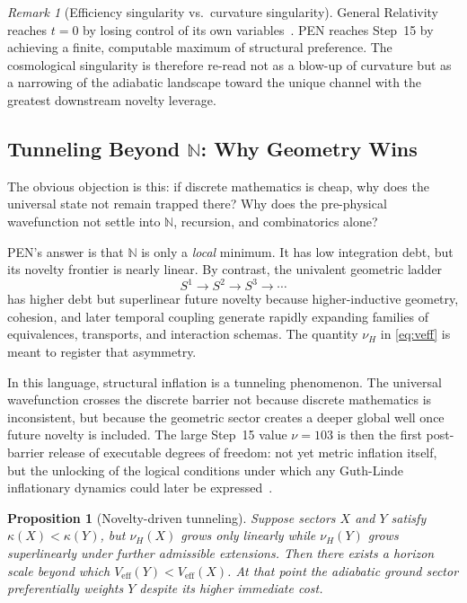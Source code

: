 \documentclass[11pt,a4paper]{article}
\theoremstyle{plain}
\newtheorem{proposition}[theorem]{Proposition}
\theoremstyle{definition}
\theoremstyle{remark}
\newtheorem{remark}[theorem]{Remark}
\newcommand{\N}{\mathbb{N}}
\begin{document}
\begin{remark}[Efficiency singularity vs.\ curvature singularity]
\label{rem:singularity-contrast}
General Relativity reaches $t = 0$ by losing control of its own variables~\cite{hawking-ellis,wald}.
PEN reaches Step~15 by achieving a finite, computable maximum of structural preference.
The cosmological singularity is therefore re-read not as a blow-up of curvature but as a narrowing of the adiabatic landscape toward the unique channel with the greatest downstream novelty leverage.
\end{remark}

\subsection{Tunneling Beyond \texorpdfstring{$\N$}{N}: Why Geometry Wins}
\label{sec:nu-explosion}

The obvious objection is this: if discrete mathematics is cheap, why does the universal state not remain trapped there?
Why does the pre-physical wavefunction not settle into $\N$, recursion, and combinatorics alone?

PEN's answer is that $\N$ is only a \emph{local} minimum.
It has low integration debt, but its novelty frontier is nearly linear.
By contrast, the univalent geometric ladder
\begin{equation}
    S^1 \to S^2 \to S^3 \to \cdots
\end{equation}
has higher debt but superlinear future novelty because higher-inductive geometry, cohesion, and later temporal coupling generate rapidly expanding families of equivalences, transports, and interaction schemas.
The quantity $\nu_H$ in \eqref{eq:veff} is meant to register that asymmetry.

In this language, structural inflation is a tunneling phenomenon.
The universal wavefunction crosses the discrete barrier not because discrete mathematics is inconsistent, but because the geometric sector creates a deeper global well once future novelty is included.
The large Step~15 value $\nu = 103$ is then the first post-barrier release of executable degrees of freedom: not yet metric inflation itself, but the unlocking of the logical conditions under which any Guth-Linde inflationary dynamics could later be expressed~\cite{guth,linde,vilenkin}.

\begin{proposition}[Novelty-driven tunneling]
\label{prop:tunneling}
Suppose sectors $X$ and $Y$ satisfy $\kappa(X) < \kappa(Y)$, but $\nu_H(X)$ grows only linearly while $\nu_H(Y)$ grows superlinearly under further admissible extensions.
Then there exists a horizon scale beyond which $V_{\mathrm{eff}}(Y) < V_{\mathrm{eff}}(X)$.
At that point the adiabatic ground sector preferentially weights $Y$ despite its higher immediate cost.
\end{proposition}
\end{document}
